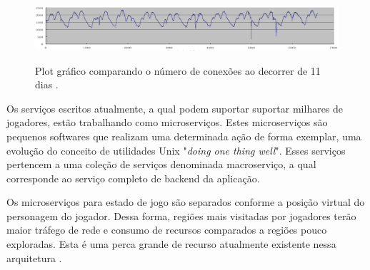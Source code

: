 \begin{figure}[h]
  \caption{Plot gráfico comparando o número de conexões ao decorrer de 11 dias
  \cite{system_performance}.}
  \centering
  \includegraphics[width=1\textwidth]{img/connection_peer_hour.png}
  \label{fig:conection_peer_hour}
\end{figure}

Os serviços escritos atualmente, a qual podem suportar suportar milhares de jogadores, estão trabalhando como microserviços\cite{stephenclarkewillson2017}\cite{albion_online_unite}. Estes microserviços são pequenos softwares que realizam uma determinada ação de forma exemplar, uma evolução do conceito de utilidades Unix "\textit{doing one thing well}". Esses serviços pertencem a uma coleção de serviços denominada macroserviço, a qual corresponde ao serviço completo de backend da aplicação.

Os microserviços para estado de jogo são separados conforme a posição virtual do personagem do jogador. Dessa forma, regiões mais visitadas por jogadores terão maior tráfego de rede e consumo de recursos comparados a regiões pouco exploradas. Esta é uma perca grande de recurso atualmente existente nessa arquitetura \cite{cloud_fog}.
